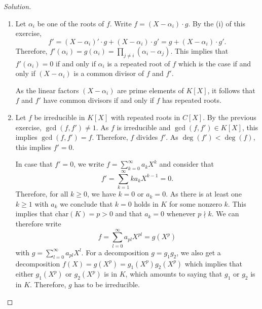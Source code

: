 \documentclass[a4paper,10pt,reqno]{amsart}
\newenvironment{sol}
  {\renewcommand\qedsymbol{$\blacksquare$}\begin{proof}[Solution]}
  {\end{proof}}
\begin{document}
\begin{sol}
\begin{enumerate}[label=(\roman*)]
        \item Let $\alpha_i$ be one of the roots of $f$. Write $f = (X - \alpha_i) \cdot g$.
        By the (i) of this exercise,
        \[
        f' = (X - \alpha_i)' \cdot g + (X - \alpha_i) \cdot g' = g + (X - \alpha_i) \cdot g'.
        \]
        Therefore, $f'(\alpha_i) = g(\alpha_i) = \prod_{j \neq i} (\alpha_i - \alpha_j)$. This implies that $f'(\alpha_i) = 0$ if and only if $\alpha_i$ is a repeated root of $f$ which is the case if and only if $(X - \alpha_i)$ is a common divisor of $f$ and $f'$.

        As the linear factors $(X-\alpha_i)$ are prime elements of $K[X]$, it follows that $f$ and $f'$ have common divisors if and only if $f$ has repeated roots.

        \item Let $f$ be irreducible in $K[X]$ with repeated roots in $C[X]$. By the previous exercise, $\gcd(f,f') \neq 1$. As $f$ is irreducible and $\gcd(f,f') \in K[X]$, this implies $\gcd(f,f') = f$. Therefore, $f$ divides $f'$. As $\deg(f') < \deg(f)$, this implies $f' = 0$.

        In case that $f' = 0$, we write $f = \sum_{k=0}^{\infty}a_kX^k$ and consider that
        \[
        f' = \sum_{k=1}^{\infty} ka_kX^{k-1} = 0.
        \]
        Therefore, for all $k \geq 0$, we have $k = 0$ or $a_k = 0$. As there is at least one $k \geq 1$ with $a_k$ we conclude that $k = 0$ holds in $K$ for some nonzero $k$. This implies that  $\mathrm{char}(K) = p > 0$ and that $a_k = 0$ whenever $p \nmid k$. We can therefore write
        \[
        f = \sum_{l = 0}^{\infty} a_{pl}X^{pl} = g(X^p)
        \]
        with $g = \sum_{l=0}^{\infty} a_{pl}X^l$. For a decomposition $g = g_1g_2$, we  also get a decomposition $f(X) = g(X^p) = g_1(X^p)g_2(X^p)$ which implies that either $g_1(X^p)$ or $g_2(X^p)$ is in $K$, which amounts to saying that $g_1$ or $g_2$ is in $K$. Therefore, $g$ has to be irreducible.\qedhere
    \end{enumerate}
    
\end{sol}
\end{document}
